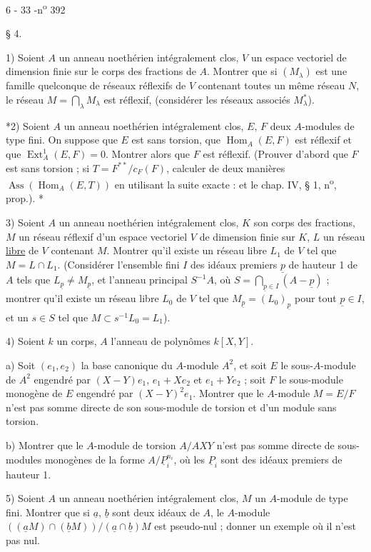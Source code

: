 \begin{center}6 - 33 -\hfill n\textsuperscript{o} 392\end{center}
\begin{center}§ 4.\end{center}

1) Soient $A$ un anneau noethérien intégralement clos, $V$ un espace vectoriel de dimension finie sur le corps des fractions de $A$. Montrer que si $(M_\lambda)$ est une famille quelconque de réseaux réflexifs de $V$ contenant toutes un même réseau $N$, le réseau $M=\bigcap_\lambda M_\lambda$ est réflexif, (considérer les réseaux associés $M_\lambda^*$).

*2) Soient $A$ un anneau noethérien intégralement clos, $E$, $F$ deux $A$-modules de type fini. On suppose que $E$ est sans torsion, que $\operatorname{Hom}_A(E,F)$ est réflexif et que $\operatorname{Ext}_A^1(E,F)=0$. Montrer alors que $F$ est réflexif. (Prouver d'abord que $F$ est sans torsion ; si $T=F^{**}/c_F(F)$, calculer de deux manières $\operatorname{Ass}(\operatorname{Hom}_A(E,T))$ en utilisant la suite exacte :
et le chap. IV, § 1, n\textsuperscript{o}\quad, prop.\quad). *

3) Soient $A$ un anneau noethérien intégralement clos, $K$ son corps des fractions, $M$ un réseau réflexif d'un espace vectoriel $V$ de dimension finie sur $K$, $L$ un réseau \uline{libre} de $V$ contenant $M$. Montrer qu'il existe un réseau libre $L_1$ de $V$ tel que $M=L\cap L_1$. (Considérer l'ensemble fini $I$ des idéaux premiers $\underline p$ de hauteur 1 de $A$ tels que $L_{\underline p}\ne M_{\underline p}$, et l'anneau principal $S^{-1}A$, où $S=\bigcap_{\underline p\in I}(A-\underline p)$ ; montrer qu'il existe un réseau libre $L_0$ de $V$ tel que $M_{\underline p}=(L_0)_{\underline p}$ pour tout $\underline p\in I$, et un $s\in S$ tel que $M\subset s^{-1}L_0=L_1$).

4) Soient $k$ un corps, $A$ l'anneau de polynômes $k[X,Y]$.

a) Soit $(e_1,e_2)$ la base canonique du $A$-module $A^2$, et soit $E$ le sous-$A$-module de $A^2$ engendré par $(X-Y)e_1$, $e_1+Xe_2$ et $e_1+Ye_2$ ; soit $F$ le sous-module monogène de $E$ engendré par $(X-Y)^2e_1$. Montrer que le $A$-module $M=E/F$ n'est pas somme directe de son sous-module de torsion et d'un module sans torsion.

b) Montrer que le $A$-module de torsion $A/AXY$ n'est pas somme directe de sous-modules monogènes de la forme $A/\underline P_i^{n_i}$, où les $\underline P_i$ sont des idéaux premiers de hauteur 1.

5) Soient $A$ un anneau noethérien intégralement clos, $M$ un $A$-module de type fini. Montrer que si $\underline a$, $\underline b$ sont deux idéaux de $A$, le $A$-module $((\underline aM)\cap(\underline bM))/(\underline a\cap\underline b)M$ est pseudo-nul ; donner un exemple où il n'est pas nul.

